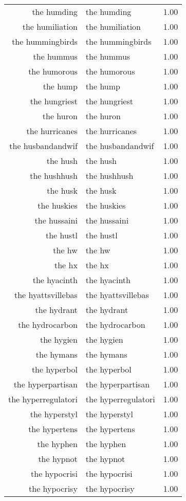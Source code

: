 \begin{table}[ht]
\begin{tabular}{rlr}
  the humding & the humding & 1.00 \\ 
  the humiliation & the humiliation & 1.00 \\ 
  the hummingbirds & the hummingbirds & 1.00 \\ 
  the hummus & the hummus & 1.00 \\ 
  the humorous & the humorous & 1.00 \\ 
  the hump & the hump & 1.00 \\ 
  the hungriest & the hungriest & 1.00 \\ 
  the huron & the huron & 1.00 \\ 
  the hurricanes & the hurricanes & 1.00 \\ 
  the husbandandwif & the husbandandwif & 1.00 \\ 
  the hush & the hush & 1.00 \\ 
  the hushhush & the hushhush & 1.00 \\ 
  the husk & the husk & 1.00 \\ 
  the huskies & the huskies & 1.00 \\ 
  the hussaini & the hussaini & 1.00 \\ 
  the hustl & the hustl & 1.00 \\ 
  the hw & the hw & 1.00 \\ 
  the hx & the hx & 1.00 \\ 
  the hyacinth & the hyacinth & 1.00 \\ 
  the hyattsvillebas & the hyattsvillebas & 1.00 \\ 
  the hydrant & the hydrant & 1.00 \\ 
  the hydrocarbon & the hydrocarbon & 1.00 \\ 
  the hygien & the hygien & 1.00 \\ 
  the hymans & the hymans & 1.00 \\ 
  the hyperbol & the hyperbol & 1.00 \\ 
  the hyperpartisan & the hyperpartisan & 1.00 \\ 
  the hyperregulatori & the hyperregulatori & 1.00 \\ 
  the hyperstyl & the hyperstyl & 1.00 \\ 
  the hypertens & the hypertens & 1.00 \\ 
  the hyphen & the hyphen & 1.00 \\ 
  the hypnot & the hypnot & 1.00 \\ 
  the hypocrisi & the hypocrisi & 1.00 \\ 
  the hypocrisy & the hypocrisy & 1.00 \\ 

\end{tabular}
\end{table}
